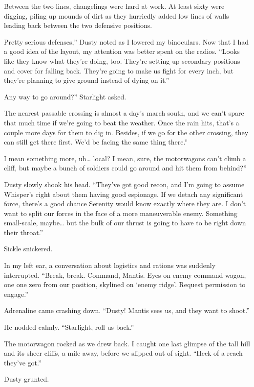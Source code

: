 Between the two lines, changelings were hard at work. At least sixty were digging, piling up mounds of dirt as they hurriedly added low lines of walls leading back between the two defensive positions.

\leavevmode{}Pretty serious defenses,” Dusty noted as I lowered my binoculars. Now that I had a good idea of the layout, my attention was better spent on the radios. “Looks like they know what they’re doing, too. They’re setting up secondary positions and cover for falling back. They’re going to make us fight for every inch, but they’re planning to give ground instead of dying on it.”

\leavevmode{}Any way to go around?” Starlight asked.

\leavevmode{}The nearest passable crossing is almost a day’s march south, and we can’t spare that much time if we’re going to beat the weather. Once the rain hits, that’s a couple more days for them to dig in. Besides, if we go for the other crossing, they can still get there first. We’d be facing the same thing there.”

\leavevmode{}I mean something more, uh… local? I mean, sure, the motorwagons can’t climb a cliff, but maybe a bunch of soldiers could go around and hit them from behind?”

Dusty slowly shook his head. “They’ve got good recon, and I’m going to assume Whisper’s right about them having good espionage. If we detach any significant force, there’s a good chance Serenity would know exactly where they are. I don’t want to split our forces in the face of a more maneuverable enemy. Something small-scale, maybe… but the bulk of our thrust is going to have to be right down their throat.”

Sickle snickered.

In my left ear, a conversation about logistics and rations was suddenly interrupted. “Break, break. Command, Mantis. Eyes on enemy command wagon, one one zero from our position, skylined on ‘enemy ridge’. Request permission to engage.”

Adrenaline came crashing down. “Dusty! Mantis sees us, and they want to shoot.”

He nodded calmly. “Starlight, roll us back.”

The motorwagon rocked as we drew back. I caught one last glimpse of the tall hill and its sheer cliffs, a mile away, before we slipped out of sight. “Heck of a reach they’ve got.”

Dusty grunted.

